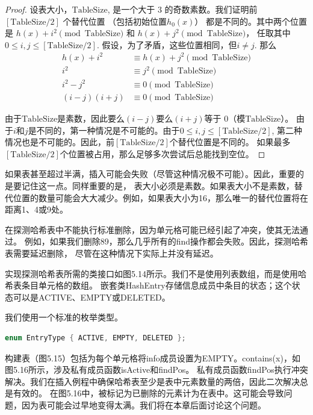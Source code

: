 \documentclass[a4paper]{ctexart}
\theoremstyle{definition}
\theoremstyle{definition}
\begin{document}
\begin{proof}
设表大小，$\text{TableSize}$, 是一个大于 $3$ 的奇数素数。我们证明前 $[\text{TableSize}/2]$ 个替代位置
（包括初始位置$h_0(x)$）
都是不同的。其中两个位置是 $h(x) + i^2 \pmod{\text{TableSize}}$ 和 $h(x) + j^2 \pmod{\text{TableSize}}$，
任取其中$0 \leq i, j \leq [\text{TableSize}/2]$. 假设，为了矛盾，这些位置相同，但$i \neq j$. 那么
\begin{align*}
  h(x) + i^2 &\equiv h(x) + j^2 \pmod{\text{TableSize}} \\
  i^2 &\equiv j^2 \pmod{\text{TableSize}} \\
  i^2 - j^2 &\equiv 0 \pmod{\text{TableSize}} \\
  (i - j)(i + j) &\equiv 0 \pmod{\text{TableSize}}
\end{align*}
  
由于$\text{TableSize}$是素数，因此要么$(i - j)$要么$(i + j)$等于 $0$（模$\text{TableSize}$）。
由于$i$和$j$是不同的，第一种情况是不可能的。由于$0 \leq i, j \leq [\text{TableSize}/2]$, 
第二种情况也是不可能的。因此，前$[\text{TableSize}/2]$个替代位置是不同的。
如果最多$[\text{TableSize}/2]$个位置被占用，那么足够多次尝试后总能找到空位。
\end{proof}

如果表甚至超过半满，插入可能会失败（尽管这种情况极不可能）。因此，重要的是要记住这一点。同样重要的是，
表大小必须是素数。如果表大小不是素数，替代位置的数量可能会大大减少。例如，如果表大小为16，那么唯一的替代位置将在距离1、4或9处。

在探测哈希表中不能执行标准删除，因为单元格可能已经引起了冲突，使其无法通过。
例如，如果我们删除89，那么几乎所有的find操作都会失败。因此，探测哈希表需要延迟删除，
尽管在这种情况下实际上并没有延迟。

实现探测哈希表所需的类接口如图5.14所示。我们不是使用列表数组，而是使用哈希表条目单元格的数组。
嵌套类HashEntry存储信息成员中条目的状态；这个状态可以是ACTIVE、EMPTY或DELETED。

我们使用一个标准的枚举类型。

\begin{lstlisting}[language=C++]
enum EntryType { ACTIVE, EMPTY, DELETED };
\end{lstlisting}

构建表（图5.15）包括为每个单元格将info成员设置为EMPTY。contains(x)，如图5.16所示，涉及私有成员函数isActive和findPos。
私有成员函数findPos执行冲突解决。我们在插入例程中确保哈希表至少是表中元素数量的两倍，因此二次解决总是有效的。
在图5.16中，被标记为已删除的元素计为在表中。这可能会导致问题，因为表可能会过早地变得太满。我们将在本章后面讨论这个问题。
\end{document}
